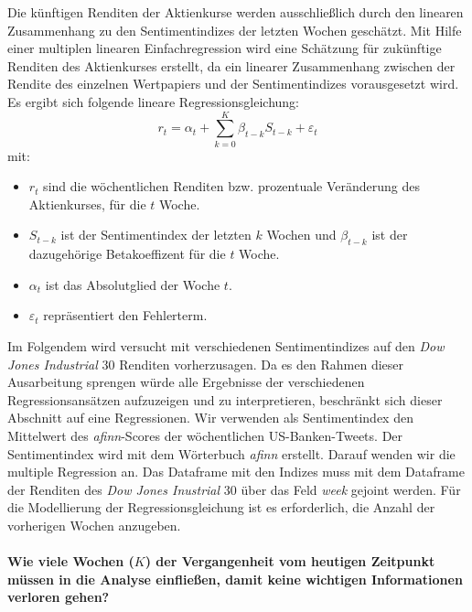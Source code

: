 Die künftigen Renditen der Aktienkurse werden ausschließlich durch den linearen Zusammenhang zu den Sentimentindizes der letzten Wochen geschätzt. Mit Hilfe einer multiplen linearen Einfachregression wird eine Schätzung für zukünftige Renditen des Aktienkurses erstellt, da ein linearer Zusammenhang zwischen der Rendite des einzelnen Wertpapiers und der Sentimentindizes vorausgesetzt wird. Es ergibt sich folgende lineare Regressionsgleichung:
\begin{equation}
r_{t}=\alpha_{t}+ \sum_{k=0}^{K} \beta_{t-k} S_{t-k}+\varepsilon_{t}
\end{equation}
mit:
\begin{itemize}
	\item  $r_{t}$ sind die wöchentlichen Renditen bzw. prozentuale Veränderung des Aktienkurses, für die $t$ Woche.
	\item $S_{t-k}$ ist der Sentimentindex der letzten $k$ Wochen und $\beta_{t-k}$ ist der dazugehörige Betakoeffizent für die $t$ Woche.
	\item $\alpha_{t}$ ist das Absolutglied der Woche $t$.
	\item $\varepsilon_{t}$ repräsentiert den Fehlerterm.
\end{itemize}
Im Folgendem wird versucht mit verschiedenen Sentimentindizes auf den \textit{Dow Jones Industrial} $30$ Renditen vorherzusagen. Da es den Rahmen dieser Ausarbeitung sprengen würde alle Ergebnisse der verschiedenen Regressionsansätzen aufzuzeigen und zu interpretieren, beschränkt sich dieser Abschnitt auf eine Regressionen. Wir verwenden als Sentimentindex den Mittelwert des \textit{afinn}-Scores der wöchentlichen US-Banken-Tweets. Der Sentimentindex wird mit dem Wörterbuch \textit{afinn} erstellt. Darauf wenden wir die multiple Regression an. Das Dataframe mit den Indizes muss mit dem Dataframe der Renditen des \textit{Dow Jones Inustrial} $30$  über das Feld \textit{week} gejoint werden. Für die Modellierung der Regressionsgleichung ist es erforderlich, die Anzahl der vorherigen Wochen anzugeben.\\
\\
\textbf{Wie viele Wochen ($K$) der Vergangenheit vom heutigen Zeitpunkt müssen in die Analyse einfließen, damit keine wichtigen Informationen verloren gehen?} 
\\
\\
